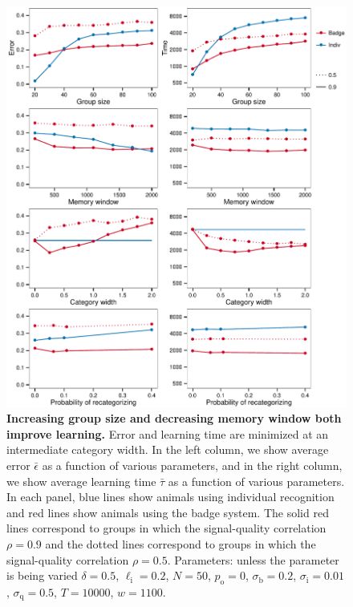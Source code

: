 \begin{figure}
\includegraphics[width=6.85in]{figures/parameters.pdf}
\caption{\sffamily\small\textbf{Increasing group size and decreasing memory window both improve learning.} Error and learning time are minimized at an intermediate category width. In the left column, we show average error $\bar{\epsilon}$ as a function of various parameters, and in the right column, we show average learning time $\bar{\tau}$ as a function of various parameters. In each panel, blue lines show animals using individual recognition and red lines show animals using the badge system. The solid red lines correspond to groups in which the signal-quality correlation $\rho=0.9$ and the dotted lines correspond to groups in which the signal-quality correlation $\rho=0.5$. Parameters: unless the parameter is being varied $\delta = 0.5$, $\ell_\text{i}=0.2$, $N=50$, $p_\text{o}=0$, $\sigma_\text{b}=0.2$, $\sigma_\text{i}=0.01$, $\sigma_\text{q}=0.5$, $T=10000$, $w=1100$.}
\label{parameters}
\end{figure}

